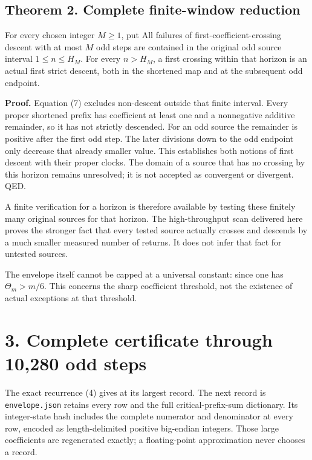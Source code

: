 \subsection{Theorem 2. Complete finite-window reduction}

For every chosen integer \(M\ge1\), put
 All
failures of first-coefficient-crossing descent with at most \(M\) odd
steps are contained in the original odd source interval
\(1\le n\le H_M\). For every \(n>H_M\), a first crossing within that
horizon is an actual first strict descent, both in the shortened map and
at the subsequent odd endpoint.

\textbf{Proof.} Equation (7) excludes non-descent outside that finite
interval. Every proper shortened prefix has coefficient at least one and
a nonnegative additive remainder, so it has not strictly descended. For
an odd source the remainder is positive after the first odd step. The
later divisions down to the odd endpoint only decrease that already
smaller value. This establishes both notions of first descent with their
proper clocks. The domain of a source that has no crossing by this
horizon remains unresolved; it is not accepted as convergent or
divergent. QED.

A finite verification for a horizon is therefore available by testing
these finitely many original sources for that horizon. The
high-throughput scan delivered here proves the stronger fact that every
tested source actually crosses and descends by a much smaller measured
number of returns. It does not infer that fact for untested sources.

The envelope itself cannot be capped at a universal constant: since
 one has \(\Theta_m>m/6\). This concerns the
sharp coefficient threshold, not the existence of actual exceptions at
that threshold.

\section{3. Complete certificate through 10,280 odd steps}

The exact recurrence (4) gives  at its largest
record. The next record is 
\nolinkurl{envelope.json} retains every row and the full
critical-prefix-sum dictionary. Its integer-state hash includes the
complete numerator and denominator at every row, encoded as
length-delimited positive big-endian integers. Those large coefficients
are regenerated exactly; a floating-point approximation never chooses a
record.

